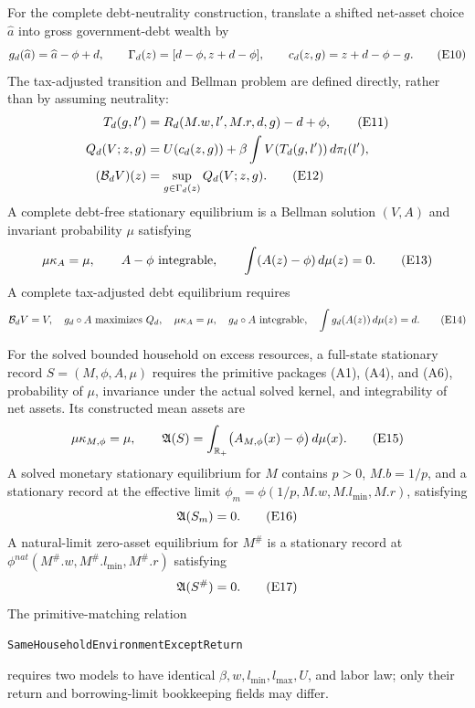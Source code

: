 \documentclass[11pt]{article}
\newcommand{\R}{\mathbb R}
\newcommand{\leanname}[1]{\nolinkurl{#1}}
\newcommand{\eqE}[1]{\refstepcounter{equation}\tag{E#1}}
\begin{document}
For the complete debt-neutrality construction, translate a shifted net-asset
choice \(\widehat a\) into gross government-debt wealth by
\begin{equation}
 g_d(\widehat a)=\widehat a-\phi+d,\qquad
 \Gamma_d(z)=[d-\phi,z+d-\phi],\qquad
 c_d(z,g)=z+d-\phi-g. \eqE{10}\label{E10}
\end{equation}
The tax-adjusted transition and Bellman problem are defined directly, rather
than by assuming neutrality:
\begin{align}
 T_d(g,l')&=R_d(M.w,l',M.r,d,g)-d+\phi, \eqE{11}\label{E11}\\
 Q_d(V;z,g)&=U(c_d(z,g))+\beta\int V(T_d(g,l'))\,d\pi_l(l'), \notag\\
 (\mathcal B_dV)(z)&=\sup_{g\in\Gamma_d(z)}Q_d(V;z,g). \eqE{12}\label{E12}
\end{align}
A complete debt-free stationary equilibrium is a Bellman solution \((V,A)\)
and invariant probability \(\mu\) satisfying
\begin{equation}
 \mu\kappa_A=\mu,\qquad A-\phi\text{ integrable},\qquad
 \int(A(z)-\phi)\,d\mu(z)=0. \eqE{13}\label{E13}
\end{equation}
A complete tax-adjusted debt equilibrium requires
\begin{equation}
 \mathcal B_dV=V,\quad g_d\circ A\text{ maximizes }Q_d,\quad
 \mu\kappa_A=\mu,\quad g_d\circ A\text{ integrable},\quad
 \int g_d(A(z))\,d\mu(z)=d. \eqE{14}\label{E14}
\end{equation}

For the solved bounded household on excess resources, a full-state stationary
record \(S=(M,\phi,A,\mu)\) requires the primitive packages (A1), (A4), and
(A6), probability of \(\mu\), invariance under the actual solved kernel, and
integrability of net assets.  Its constructed mean assets are
\begin{equation}
 \mu\kappa_{M,\phi}=\mu,\qquad
 \mathfrak A(S)=\int_{\R_+}\bigl(A_{M,\phi}(x)-\phi\bigr)\,d\mu(x).
 \eqE{15}\label{E15}
\end{equation}
A solved monetary stationary equilibrium for \(M\) contains \(p>0\),
\(M.b=1/p\), and a stationary record at the effective limit
\(\phi_m=\phi(1/p,M.w,M.l_{\min},M.r)\), satisfying
\begin{equation}
 \mathfrak A(S_m)=0. \eqE{16}\label{E16}
\end{equation}
A natural-limit zero-asset equilibrium for \(M^\#\) is a stationary record at
\(\phi^{nat}(M^\#.w,M^\#.l_{\min},M^\#.r)\) satisfying
\begin{equation}
 \mathfrak A(S^\#)=0. \eqE{17}\label{E17}
\end{equation}
The primitive-matching relation
\begin{center}
\leanname{SameHouseholdEnvironmentExceptReturn}
\end{center}
requires two models to have identical \(\beta,w,l_{\min},l_{\max},U\), and
labor law; only their return and borrowing-limit bookkeeping fields may differ.
\end{document}
